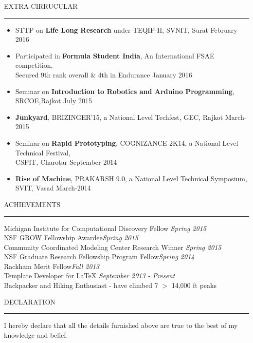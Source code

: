 \documentclass{resume} %
\renewenvironment{rSection}[1]{
    \sectionskip
    \textcolor{TsinghuaPurple}{\MakeUppercase{#1}}
    \sectionlineskip
    \hrule
    \begin{list}{}{
        \setlength{\leftmargin}{0em}
    }
    \item[]
}{\end{list}}
\begin{document}
\begin{rSection}{Extra-Cirrucular} \itemsep -2pt

    \begin{itemize}

        \item STTP on \textbf{Life Long Research} under TEQIP-II, SVNIT, Surat \hfill February 2016
        \item Participated in \textbf{Formula Student India}, An International FSAE competition,
              \\Secured 9th rank overall \& 4th in Endurance \hfill January 2016
        \item Seminar on \textbf{Introduction to Robotics and Arduino Programming}, SRCOE,Rajkot \hfill July 2015
        \item \textbf{Junkyard}, BRIZINGER'15, a National Level Techfest,  GEC, Rajkot \hfill March-2015
        \item Seminar on \textbf{Rapid Prototyping}, COGNIZANCE 2K14, a National Level Technical Festival, \\CSPIT, Charotar  \hfill September-2014
        \item \textbf{Rise of Machine}, PRAKARSH 9.0, a National Level Technical Symposium, SVIT, Vasad \hfill March-2014

    \end{itemize}


\end{rSection}




\begin{rSection}{Achievements} \itemsep -2pt
    {Michigan Institute for Computational Discovery Fellow }\hfill {\em Spring 2015} \\
    {NSF GROW Fellowship Awardee}\hfill {\em Spring 2015} \\
    {Community Coordinated Modeling Center Research Winner} \hfill {\em Spring 2015} \\
    {NSF Graduate Research Fellowship Program Fellow}\hfill {\em Spring 2014}\\
    {Rackham Merit Fellow}\hfill {\em Fall 2013}\\
    {Template Developer for LaTeX} \hfill {\em September 2013 - Present} \\
    {Backpacker and Hiking Enthusiast - have climbed 7 $>$ 14,000 ft peaks}
\end{rSection}



\begin{rSection}{ Declaration  } \itemsep -3pt

    \item I hereby declare that all the details furnished above are true to the best of my knowledge and belief.

\end{rSection}
\end{document}
